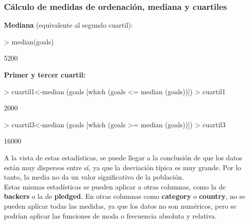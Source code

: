 \documentclass [a4paper] {article}
\begin{document}
\subsubsection{Cálculo de medidas de ordenación, mediana y cuartiles}
\textbf{Mediana} (equivalente al segundo cuartil):
\begin{Schunk}
\begin{Sinput}
> median(goals)
\end{Sinput}
\begin{Soutput}
[1] 5200
\end{Soutput}
\end{Schunk}
\textbf{Primer y tercer cuartil:}
\begin{Schunk}
\begin{Sinput}
> cuartil1<-median (goals [which (goals <= median (goals))])	
> cuartil1
\end{Sinput}
\begin{Soutput}
[1] 2000
\end{Soutput}
\begin{Sinput}
> cuartil3<-median (goals [which (goals >= median (goals))])	
> cuartil3
\end{Sinput}
\begin{Soutput}
[1] 16000
\end{Soutput}
\end{Schunk}
A la vista de estas estadísticas, se puede llegar a la conclusión de que los datos están muy dispersos entre sí,
ya que la desviación típica es muy grande. Por lo tanto, la media no da un valor significativo de la población.\\
Estas mismas estadísticas se pueden aplicar a otras columnas, como la de \textbf{backers} o la de \textbf{pledged}.
En otras columnas como \textbf{category} o \textbf{country}, no se pueden aplicar todas las medidas, ya que los datos no son numéricos,
pero se podrían aplicar las funciones de moda o frecuencia absoluta y relativa.
\end{document}
